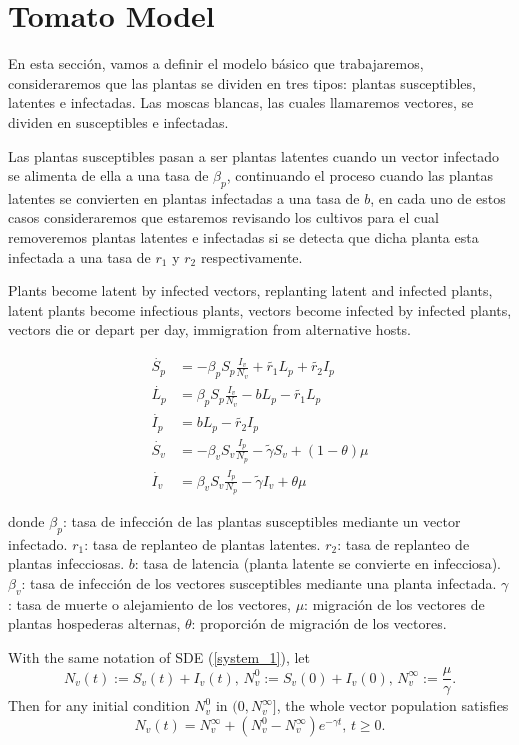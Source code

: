 \section{Tomato Model}
En esta secci\'on, vamos a definir el modelo b\'asico que trabajaremos, consideraremos que las plantas se dividen en tres tipos: plantas susceptibles, latentes e infectadas. Las moscas blancas, las cuales llamaremos vectores, se dividen en susceptibles e infectadas.

Las plantas susceptibles pasan a ser plantas latentes cuando un vector infectado se alimenta de ella a una tasa de $\beta_p$, continuando el proceso cuando las plantas latentes se convierten en plantas infectadas a una tasa de $b$, en cada uno de estos casos consideraremos que estaremos revisando los cultivos para el cual removeremos plantas latentes e infectadas si se detecta que dicha planta esta infectada a una tasa de $r_1$ y $r_2$ respectivamente.

Plants become latent by
infected vectors,
replanting latent and
infected plants,
latent plants become
infectious plants,
vectors become infected by
infected plants,
vectors die or depart per
day,
immigration from
alternative hosts.

\begin{align}\label{system_1}
	\dot{S_p} &=
		-\beta_p S_p \frac{I_v}{N_v} + \tilde{r_1} L_p + \tilde{r_2} I_p \\
	\dot{L_p} &=
		\beta_p S_p \frac{I_v}{N_v} - b L_p - \tilde{r_1} L_p \\
	\dot{I_p} &=
		b L_p - \tilde{r_2} I_p \\
	\dot{S_v} &=
		-\beta_v S_v \frac{I_p}{N_p} -\tilde{\gamma} S_v +(1-\theta) \mu \\
	\dot{I_v} &=
		\beta_v S_v \frac{I_p}{N_p} -\tilde{\gamma} I_v + \theta \mu
\end{align}

donde $\beta_p$: tasa de infecci\'on de las plantas susceptibles mediante un vector infectado. $r_1$: tasa de replanteo de plantas latentes. $r_2$: tasa de replanteo de plantas infecciosas. $b$: tasa de latencia (planta latente se convierte en infecciosa). $\beta_v$: tasa de infecci\'on de los vectores susceptibles mediante una planta infectada. $\gamma$: tasa de muerte o alejamiento de los vectores, $\mu$: migraci\'on de los vectores de plantas hospederas alternas, $\theta$: proporci\'on de migraci\'on de los vectores.

\begin{theorem}\label{theorem_1}
	With the same notation of SDE (\ref{system_1}), let
	\begin{equation*}
	N_v(t) := S_v(t) + I_v(t),\, N_v^0 := S_v(0) + I_v(0),\, N_v^{\infty} := \frac{\mu}{\gamma}.
	\end{equation*}
	Then for any initial condition $N_v^0$ in $(0, N^\infty_v]$, the whole vector population satisfies
	\begin{equation*}
	N_v(t) = N^\infty_v +(N^0_v-N^\infty_v)e^{-\gamma t},\, t\geq 0.
	\end{equation*}
\end{theorem}

